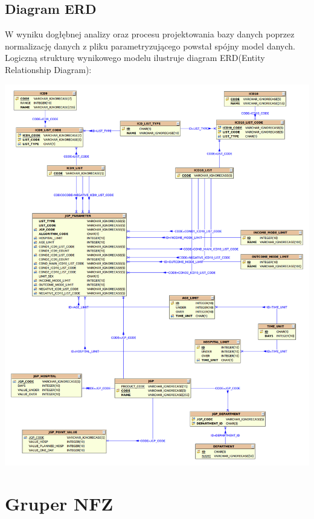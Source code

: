 \newpage
\subsection{Diagram ERD}
\label{sec:diagramERD}

W wyniku dogłębnej analizy oraz procesu projektowania bazy danych poprzez normalizację danych z pliku parametryzującego powstał spójny model danych. Logiczną strukturę wynikowego modelu ilustruje diagram ERD(Entity Relationship Diagram):

\includegraphics[scale=0.31]{images/erd}

\section{Gruper NFZ}
\label{sec:gruperNFZ}

